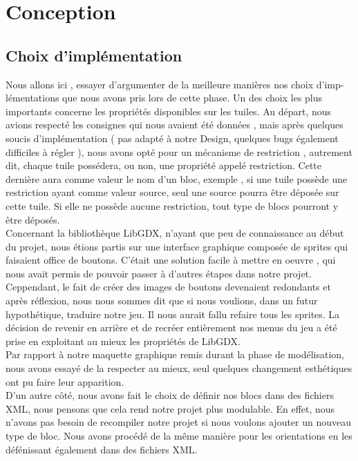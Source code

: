 \documentclass[a4paper,10pt]{article}
\begin{document}
\section{Conception}
\subsection{Choix d'implémentation}
Nous allons ici , essayer d'argumenter de la meilleure manières nos choix d'imp-\\lémentations que nous avons pris lors de cette phase.
Un des choix les plus importants concerne les propriétés disponibles sur les tuiles. Au départ, nous avions respecté les consignes qui nous
avaient été données , mais après quelques soucis d'implémentation ( pas adapté à notre Design, quelques bugs également difficiles à régler ), nous
avons opté pour un mécanisme de restriction , autrement dit, chaque tuile possédera, ou non, une propriété appelé restriction. Cette dernière aura
comme valeur le nom d'un bloc, exemple , si une tuile possède une restriction ayant comme valeur source, seul une source pourra être déposée sur cette tuile.
Si elle ne possède aucune restriction, tout type de blocs pourront y être déposés. 
\\
Concernant la bibliothèque LibGDX, n'ayant que peu de connaissance au début du projet, nous étions partis sur une interface graphique composée de sprites qui faisaient
office de boutons. C'était une solution facile à mettre en oeuvre , qui nous avait permis de pouvoir passer à d'autres étapes dans notre projet.\\
Ceppendant, le fait de créer des images de boutons devenaient redondants et après réflexion, nous nous sommes dit que si nous voulions, dans un futur
hypothétique, traduire notre jeu. Il nous aurait fallu refaire tous les sprites. La décision de revenir en arrière et de recréer entièrement nos menus 
du jeu a été prise en exploitant au mieux les propriétés de LibGDX. 
\\
Par rapport à notre maquette graphique remis durant la phase de modélisation, nous avons essayé de la respecter au mieux, seul quelques changement
esthétiques ont pu faire leur apparition.
\\
D'un autre côté, nous avons fait le choix de définir nos blocs dans des fichiers XML, nous pensons que cela rend notre projet plus modulable. En effet, nous 
n'avons pas besoin de recompiler notre projet si nous voulons ajouter un nouveau type de bloc. Nous avons procédé de la même manière pour les orientations
en les défénissant également dans des fichiers XML.
\end{document}
